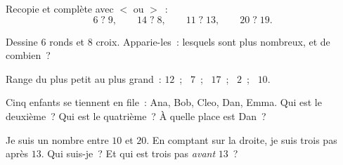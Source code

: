 \begin{exercise}[$\star$]\label{exo:g1:counting:5}
Recopie et complète avec $<$ ou $>$~:
\[
6 \;?\; 9, \qquad
14 \;?\; 8, \qquad
11 \;?\; 13, \qquad
20 \;?\; 19 .
\]
\end{exercise}

\begin{exercise}[$\star$]\label{exo:g1:counting:6}
Dessine $6$ ronds et $8$ croix. Apparie-les~: lesquels sont plus
nombreux, et de combien~?
\end{exercise}

\begin{exercise}[$\star$]\label{exo:g1:counting:7}
Range du plus petit au plus grand~: $12$~; \ $7$~; \ $17$~; \ $2$~;
\ $10$.
\end{exercise}

\begin{exercise}[$\star$]\label{exo:g1:counting:8}
Cinq enfants se tiennent en file~: Ana, Bob, Cleo, Dan, Emma. Qui est
le deuxième~? Qui est le quatrième~? À quelle place est Dan~?
\end{exercise}

\begin{exercise}[$\star\star$]\label{exo:g1:counting:9}
Je suis un nombre entre $10$ et $20$. En comptant sur la droite, je
suis trois pas après $13$. Qui suis-je~? Et qui est trois pas
\emph{avant} $13$~?
\end{exercise}
